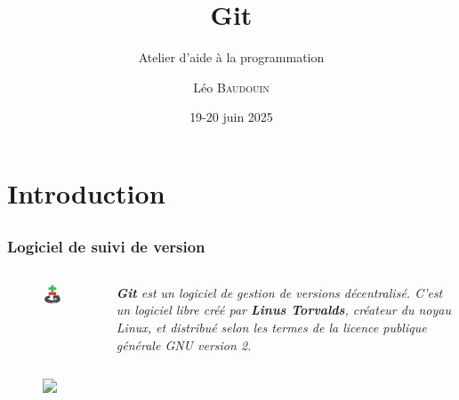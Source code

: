 \documentclass{beamer}
\title{Git}
\subtitle{Atelier d'aide à la programmation}
\author{L\'eo \textsc{Baudouin}}
\institute{
  {\url{baudouin.leo @ gmail.com}}
}
\date{19-20 juin 2025}
\begin{document}
\begin{frame}
  \titlepage
\end{frame}

\section{Introduction}

\subsection{}
\begin{frame}[label=git]
  \frametitle{Logiciel de suivi de version}
  \begin{columns}
    \begin{column}{0.2\linewidth}
      \begin{figure}
	\includegraphics[width=0.95\linewidth]{images/git-logo}  
      \end{figure}
    \end{column}
    \begin{column}{0.8\linewidth}  
      \textit{\textbf{Git} est un logiciel de gestion de versions décentralisé. C'est un logiciel libre créé par \textbf{Linus Torvalds}, créateur du noyau Linux, et distribué selon les termes de la licence publique générale GNU version 2.}
    \end{column}
  \end{columns}
  
  \begin{figure}
    \includegraphics<2>[width=0.95\linewidth]{images/github}  
  \end{figure}
  
\end{frame}
\end{document}
